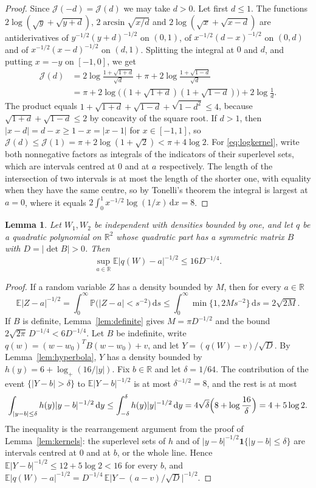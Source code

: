 \documentclass[11pt]{amsart}
\numberwithin{equation}{section}
\newtheorem{lemma}[theorem]{Lemma}
\theoremstyle{definition}
\theoremstyle{remark}
\newcommand{\R}{\mathbb R}
\newcommand{\E}{\mathbb E}
\newcommand{\PP}{\mathbb P}
\newcommand{\1}{\mathbf 1}
\newcommand{\dd}{\,\mathrm d}
\newcommand{\logp}{\log_+}
\newcommand{\abs}[1]{\lvert #1\rvert}
\begin{document}
\begin{proof}
Since $\mathcal J(-d)=\mathcal J(d)$ we may take $d>0$. Let first $d\le1$. The functions $2\log(\sqrt y+\sqrt{y+d})$, $2\arcsin\sqrt{x/d}$ and $2\log(\sqrt x+\sqrt{x-d})$ are antiderivatives of $y^{-1/2}(y+d)^{-1/2}$ on $(0,1)$, of $x^{-1/2}(d-x)^{-1/2}$ on $(0,d)$ and of $x^{-1/2}(x-d)^{-1/2}$ on $(d,1)$. Splitting the integral at $0$ and $d$, and putting $x=-y$ on $[-1,0]$, we get
\begin{align*}
\mathcal J(d)&=2\log\frac{1+\sqrt{1+d}}{\sqrt d}+\pi+2\log\frac{1+\sqrt{1-d}}{\sqrt d}\\
&=\pi+2\log\bigl((1+\sqrt{1+d})(1+\sqrt{1-d})\bigr)+2\log\frac1d .
\end{align*}
The product equals $1+\sqrt{1+d}+\sqrt{1-d}+\sqrt{1-d^2}\le4$, because $\sqrt{1+d}+\sqrt{1-d}\le2$ by concavity of the square root. If $d>1$, then $\abs{x-d}=d-x\ge1-x=\abs{x-1}$ for $x\in[-1,1]$, so $\mathcal J(d)\le\mathcal J(1)=\pi+2\log(1+\sqrt2)<\pi+4\log2$. For \eqref{eq:logkernel}, write both nonnegative factors as integrals of the indicators of their superlevel sets, which are intervals centred at $0$ and at $a$ respectively. The length of the intersection of two intervals is at most the length of the shorter one, with equality when they have the same centre, so by Tonelli's theorem the integral is largest at $a=0$, where it equals $2\int_0^1x^{-1/2}\log(1/x)\dd x=8$.
\end{proof}

\begin{lemma}\label{lem:pairhalf}
Let $W_1,W_2$ be independent with densities bounded by one, and let $q$ be a quadratic polynomial on $\R^2$ whose quadratic part has a symmetric matrix $B$ with $D=\abs{\det B}>0$. Then
\[
\sup_{a\in\R}\E\abs{q(W)-a}^{-1/2}\le16D^{-1/4}.
\]
\end{lemma}

\begin{proof}
If a random variable $Z$ has a density bounded by $M$, then for every $a\in\R$
\begin{equation}\label{eq:boundedhalf}
\E\abs{Z-a}^{-1/2}=\int_0^\infty\PP\bigl(\abs{Z-a}<s^{-2}\bigr)\dd s\le\int_0^\infty\min\{1,2Ms^{-2}\}\dd s=2\sqrt{2M}.
\end{equation}
If $B$ is definite, Lemma~\ref{lem:definite} gives $M=\pi D^{-1/2}$ and the bound $2\sqrt{2\pi}\,D^{-1/4}<6D^{-1/4}$. Let $B$ be indefinite, write $q(w)=(w-w_0)^TB(w-w_0)+v$, and let $Y=(q(W)-v)/\sqrt D$. By Lemma~\ref{lem:hyperbola}, $Y$ has a density bounded by $h(y)=6+\logp(16/\abs y)$. Fix $b\in\R$ and let $\delta=1/64$. The contribution of the event $\{\abs{Y-b}>\delta\}$ to $\E\abs{Y-b}^{-1/2}$ is at most $\delta^{-1/2}=8$, and the rest is at most
\[
\int_{\abs{y-b}\le\delta}h(y)\abs{y-b}^{-1/2}\dd y\le\int_{-\delta}^\delta h(y)\abs y^{-1/2}\dd y=4\sqrt\delta\Bigl(8+\log\frac{16}\delta\Bigr)=4+5\log2 .
\]
The inequality is the rearrangement argument from the proof of Lemma~\ref{lem:kernels}: the superlevel sets of $h$ and of $\abs{y-b}^{-1/2}\1\{\abs{y-b}\le\delta\}$ are intervals centred at $0$ and at $b$, or the whole line. Hence $\E\abs{Y-b}^{-1/2}\le12+5\log2<16$ for every $b$, and $\E\abs{q(W)-a}^{-1/2}=D^{-1/4}\,\E\abs{Y-(a-v)/\sqrt D}^{-1/2}$.
\end{proof}
\end{document}
